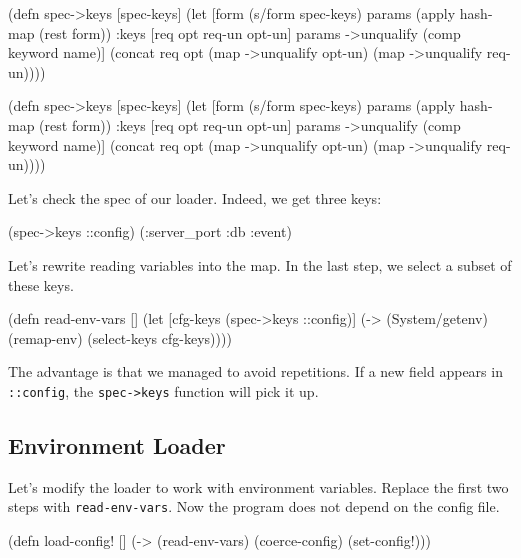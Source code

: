 \ifx\DEVICETYPE\MOBILE

\begin{clojure}
(defn spec->keys
  [spec-keys]
  (let [form (s/form spec-keys)
        params (apply hash-map
                 (rest form))
        {:keys [req opt req-un opt-un]}
        params
        ->unqualify (comp keyword name)]
    (concat req
            opt
            (map ->unqualify opt-un)
            (map ->unqualify req-un))))
\end{clojure}

\else

\begin{clojure}
(defn spec->keys
  [spec-keys]
  (let [form (s/form spec-keys)
        params (apply hash-map (rest form))
        {:keys [req opt req-un opt-un]} params
        ->unqualify (comp keyword name)]
    (concat req
            opt
            (map ->unqualify opt-un)
            (map ->unqualify req-un))))
\end{clojure}

\fi

\noindent
Let's check the spec of our loader. Indeed, we get three keys:

\begin{clojure}
(spec->keys ::config)
(:server_port :db :event)
\end{clojure}

\noindent
Let's rewrite reading variables into the map. In the last step, we select a subset of these keys.

\begin{clojure}
(defn read-env-vars []
  (let [cfg-keys (spec->keys ::config)]
    (-> (System/getenv)
        (remap-env)
        (select-keys cfg-keys))))
\end{clojure}

The advantage is that we managed to avoid repetitions. If a new field appears in \verb|::config|, the \verb|spec->keys| function will pick it up.

\subsection{Environment Loader}

Let's modify the loader to work with environment variables. Replace the first two steps with \verb|read-env-vars|. Now the program does not depend on the config file.

\begin{clojure}
(defn load-config! []
  (-> (read-env-vars)
      (coerce-config)
      (set-config!)))
\end{clojure}

